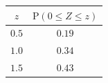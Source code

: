 {\setlength{\tabcolsep}{4pt}\renewcommand{\arraystretch}{1.3}\small%
\begin{tabular}{|c|c|}
\hline
$z$ & $\mathrm{P}(0\le Z\le z)$ \\
\hline
$0.5$ & $0.19$ \\
\hline
$1.0$ & $0.34$ \\
\hline
$1.5$ & $0.43$ \\
\hline
\end{tabular}}
